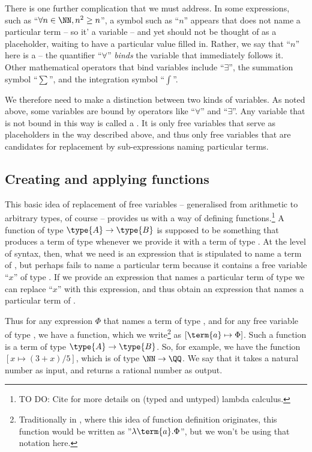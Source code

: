 There is one further complication that we must address.  In some expressions, such as 
``$
\forall n \in \NN, n^2 \geq n
$'', 
a symbol such as ``$n$'' appears that does not name a particular term -- so it' a variable -- and yet should not be thought of as a placeholder, waiting to have a particular value filled in.  Rather, we say that ``$n$'' here is a  -- the quantifier ``$\forall$'' \emph{binds} the variable that immediately follows it.  Other mathematical operators that bind variables include ``$\exists$'', the summation symbol ``$\sum$'', and the integration symbol ``$\int$''.

We therefore need to make a distinction between two kinds of variables.  As noted above, some variables are bound by operators like ``$\forall$'' and ``$\exists$''.  Any variable that is not bound in this way is called a .  It is only free variables that serve as placeholders in the way described above, and thus only free variables that are candidates for replacement by sub-expressions naming particular terms.


\subsection{Creating and applying functions}

This basic idea of replacement of free variables -- generalised from arithmetic to arbitrary types, of course -- provides us with a way of defining functions.\footnote{
TO DO: Cite for more details on (typed and untyped) lambda calculus.
}
A function of type $\type{A} \to \type{B}$ is supposed to be something that produces a term of type  whenever we provide it with a term of type .  At the level of syntax, then, what we need is an expression that is stipulated to name a term of , but perhaps fails to name a particular term because it contains a free variable ``$x$'' of type .  If we provide an expression that names a particular term of type  we can replace ``$x$'' with this expression, and thus obtain an expression that names a particular term of .

Thus for any expression
$\Phi$ that names a term of type , 
and for any free variable  of type , 
we have a function, which we write\footnote{
Traditionally in , where this idea of function definition originates, this function would be written as 
''$\lambda \term{a} . \Phi$'', but we won't be using that notation here.
} 
as $[\term{a} \mapsto \Phi]$.
Such a function is a term of type $\type{A} \to \type{B}$.  
So, for example, we have the function
$[x \mapsto (3 + x)/5]$, which is of type 
$\NN \to \QQ$.  We say that it takes a natural number as input, and returns a rational number as output.

